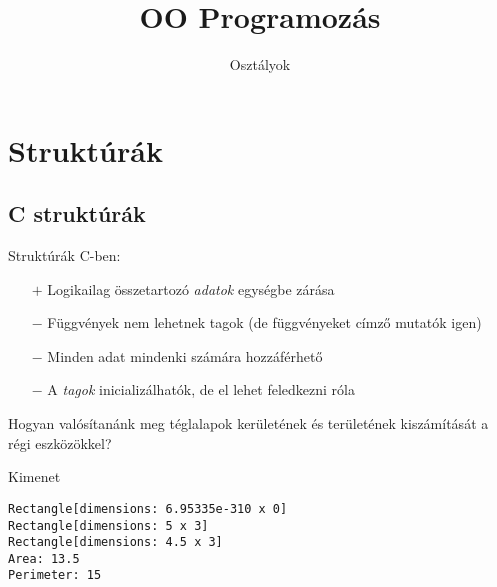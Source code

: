 \documentclass[usenames,dvipsnames,aspectratio=169]{beamer}
\title[OO Programozás - C++]{OO Programozás}
\subtitle{Osztályok}
\begin{document}
\begin{frame}[plain]
  \titlepage
  \logoalul
\end{frame}

\section{Struktúrák}

\subsection{C struktúrák}

\begin{frame}
    Struktúrák C-ben:
    \begin{itemize}
        \item[$+$] Logikailag összetartozó \emph{adatok} egységbe zárása
        \item[$-$] Függvények nem lehetnek tagok (de függvényeket címző mutatók igen)
        \item[$-$] Minden adat mindenki számára hozzáférhető
        \item[$-$] A \emph{tagok} inicializálhatók, de el lehet feledkezni róla 
    \end{itemize}
    \vfill
    Hogyan valósítanánk meg téglalapok kerületének és területének kiszámítását a régi eszközökkel?
\end{frame}

\begin{frame}
    \begin{exampleblock}{}
        
    \end{exampleblock}
\end{frame}

\begin{frame}
    \begin{exampleblock}{}
        \scriptsize
        
    \end{exampleblock}
\end{frame}

\begin{frame}[fragile]
    \begin{exampleblock}{}
        \scriptsize
        
    \end{exampleblock}
    \begin{block}{Kimenet}
        \vspace{-.3cm}
        \tiny
        \begin{verbatim}
Rectangle[dimensions: 6.95335e-310 x 0]
Rectangle[dimensions: 5 x 3]
Rectangle[dimensions: 4.5 x 3]
Area: 13.5
Perimeter: 15
\end{verbatim}
    \vspace{-.3cm}
    \end{block}
\end{frame}
\end{document}
